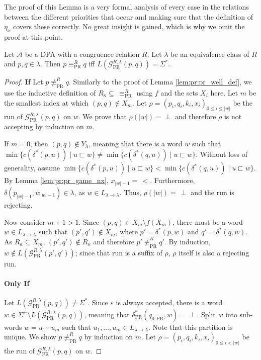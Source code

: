 	The proof of this Lemma is a very formal analysis of every case in the relations between the different priorities that occur and making sure that the definition of $\eta_x$ covers these correctly. No great insight is gained, which is why we omit the proof at this point.

\begin{theorem}
	Let $\mathcal{A}$ be a DPA with a congruence relation $R$. Let $\lambda$ be an equivalence class of $R$ and $p, q \in \lambda$. Then $p \equiv_\text{PR}^R q$ iff $L(\mathcal{G}_\text{PR}^{R,\lambda}(p, q)) = \Sigma^*$.
\end{theorem}

\begin{proof}
	\textbf{If } Let $p \not\equiv_\text{PR}^R q$. Similarly to the proof of Lemma \ref{lem:pr:pr_well_def}, we use the inductive definition of $R_\kappa \subseteq\, \equiv_\text{PR}^R$ using $f$ and the sets $X_i$ here. Let $m$ be the smallest index at which $(p, q) \notin X_m$. Let $\rho = (p_i, q_i, k_i, x_i)_{0 \leq i \leq |w|}$ be the run of $\mathcal{G}_\text{PR}^{R,\lambda}(p, q)$ on $w$. We prove that $\rho(|w|) = \perp$ and therefore $\rho$ is not accepting by induction on $m$.
	
	If $m = 0$, then $(p, q) \notin Y_\lambda$, meaning that there is a word $w$ such that $\min \{ c(\delta^*(p, u)) \mid u \sqsubset w \} \neq \min \{ c(\delta^*(q, u)) \mid u \sqsubset w \}$. Without loss of generality, assume $\min \{ c(\delta^*(p, u)) \mid u \sqsubset w \} < \min \{ c(\delta^*(q, u)) \mid u \sqsubset w \}$. By Lemma \ref{lem:pr:pr_game_nx}, $x_{|w|-1} =\, <$. Furthermore, $\delta(p_{|w|-1}, w_{|w|-1}) \in \lambda$, as $w \in L_{\lambda \rightarrow \lambda}$. Thus, $\rho(|w|) =\, \perp$ and the run is rejecting.
	
	Now consider $m+1 > 1$. Since $(p, q) \in X_m \setminus f(X_m)$, there must be a word $w \in L_{\lambda \rightarrow \lambda}$ such that $(p', q') \notin X_m$, where $p' = \delta^*(p, w)$ and $q' = \delta^*(q, w)$. As $R_\kappa \subseteq X_m$, $(p', q') \notin R_\kappa$ and therefore $p' \not\equiv_\text{PR}^R q'$. By induction, $w \notin L(\mathcal{G}_\text{PR}^{R,\lambda}(p', q'))$; since that run is a suffix of $\rho$, $\rho$ itself is also a rejecting run.
	
	\paragraph{Only If} Let $L(\mathcal{G}_\text{PR}^{R,\lambda}(p, q)) \neq \Sigma^*$. Since $\varepsilon$ is always accepted, there is a word $w \in \Sigma^+ \setminus L(\mathcal{G}_\text{PR}^{R,\lambda}(p, q))$, meaning that $\delta_\text{PR}^*(q_{0,\text{PR}}, w) = \perp$. Split $w$ into sub-words $w = u_1 \cdots u_m$ such that $u_1, \dots, u_m \in L_{\lambda \rightarrow \lambda}$. Note that this partition is unique. We show $p \not\equiv_\text{PR}^R q$ by induction on $m$. Let $\rho = (p_i, q_i, k_i, x_i)_{0 \leq i < |w|}$ be the run of $\mathcal{G}_\text{PR}^{R,\lambda}(p, q)$ on $w$.
	

\end{proof}
